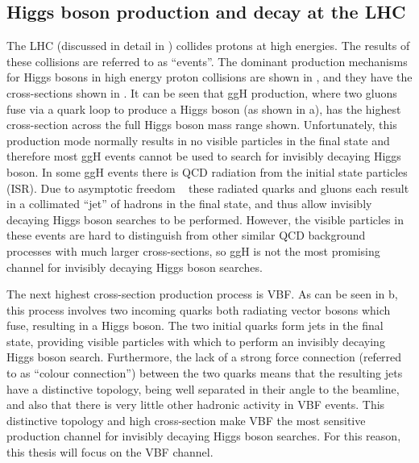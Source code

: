 \subsection{Higgs boson production and decay at the LHC}
\label{sec:higprod}
The LHC (discussed in detail in ) collides protons at high energies. The results of these collisions are referred to as ``events''. The dominant production mechanisms for Higgs bosons in high energy proton collisions are shown in , and they have the cross-sections shown in . It can be seen that \ac{ggH} production, where two gluons fuse via a quark loop to produce a Higgs boson (as shown in a), has the highest cross-section across the full Higgs boson mass range shown. Unfortunately, this production mode normally results in no visible particles in the final state and therefore most \ac{ggH} events cannot be used to search for invisibly decaying Higgs boson. In some \ac{ggH} events there is \ac{QCD} radiation from the initial state particles (\ac{ISR}). Due to asymptotic freedom ~\cite{PhysRevLett.30.1343,PhysRevLett.30.1346} these radiated quarks and gluons each result in a collimated ``jet'' of hadrons in the final state, and thus allow invisibly decaying Higgs boson searches to be performed. However, the visible particles in these events are hard to distinguish from other similar \ac{QCD} background processes with much larger cross-sections, so \ac{ggH} is not the most promising channel for invisibly decaying Higgs boson searches.

The next highest cross-section production process is \ac{VBF}. As can be seen in b, this process involves two incoming quarks both radiating vector bosons which fuse, resulting in a Higgs boson. The two initial quarks form jets in the final state, providing visible particles with which to perform an invisibly decaying Higgs boson search. Furthermore, the lack of a strong force connection (referred to as ``colour connection'') between the two quarks means that the resulting jets have a distinctive topology, being well separated in their angle to the beamline, and also that there is very little other hadronic activity in \ac{VBF} events. This distinctive topology and high cross-section make \ac{VBF} the most sensitive production channel for invisibly decaying Higgs boson searches. For this reason, this thesis will focus on the \ac{VBF} channel.

